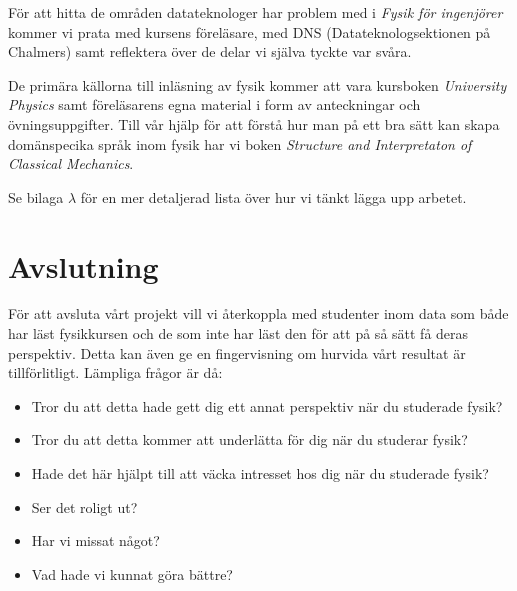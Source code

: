 \documentclass[12pt,a4paper]{article}
\begin{document}
För att hitta de områden datateknologer har problem med i \textit{Fysik för
ingenjörer} kommer vi prata med kursens föreläsare, med DNS
(Datateknologsektionen på Chalmers) samt reflektera över de delar vi själva
tyckte var svåra.

De primära källorna till inläsning av fysik kommer att vara kursboken
\textit{University Physics}\cite{UP} samt föreläsarens egna material i form av
anteckningar och övningsuppgifter. Till vår hjälp för att förstå hur man på ett
bra sätt kan skapa domänspecika språk inom fysik har vi boken \textit{Structure
and Interpretaton of Classical Mechanics}\cite{SICM}.

Se bilaga $\lambda$ för en mer detaljerad lista över hur vi tänkt lägga upp arbetet.


\section{Avslutning}

För att avsluta vårt projekt vill vi återkoppla med studenter inom data som både
har läst fysikkursen och de som inte har läst den för att på så sätt få deras
perspektiv. Detta kan även ge en fingervisning om hurvida vårt resultat är
tillförlitligt. Lämpliga frågor är då:

\begin{itemize}
    \item Tror du att detta hade gett dig ett annat perspektiv när du studerade fysik?
    \item Tror du att detta kommer att underlätta för dig när du studerar fysik?
    \item Hade det här hjälpt till att väcka intresset hos dig när du studerade fysik?
    \item Ser det roligt ut?
    \item Har vi missat något?
    \item Vad hade vi kunnat göra bättre?
\end{itemize}
\end{document}
